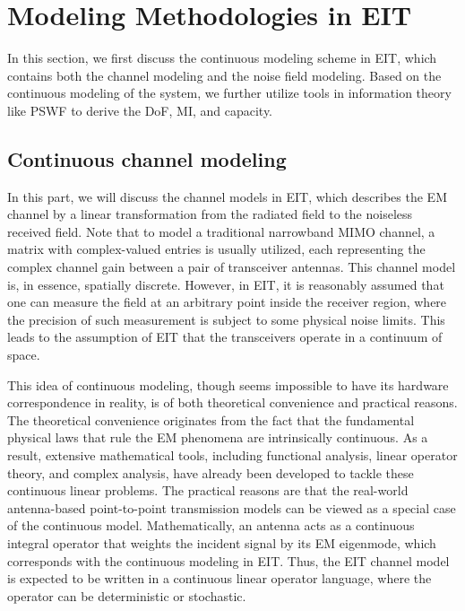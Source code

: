 \documentclass[journal,twocolumn]{IEEEtran}
\begin{document}
\section{Modeling Methodologies in EIT}
In this section, we first discuss the continuous modeling scheme in EIT, which contains both the channel modeling and the noise field modeling. 
Based on the continuous modeling of the system, we further utilize tools in information theory like PSWF to derive the DoF, MI, and capacity.

\subsection{Continuous channel modeling}
In this part, we will discuss the channel models in EIT, which describes the EM channel by a linear transformation from the radiated field to the noiseless received field.  
Note that to model a traditional narrowband MIMO channel, a matrix with complex-valued entries is usually utilized, each representing the complex channel gain between a pair of transceiver antennas. 
This channel model is, in essence, spatially discrete. 
However, in EIT, it is reasonably assumed that one can measure the field at an arbitrary point inside the receiver region, where the precision of such measurement is subject to some physical noise limits. This leads to the assumption of EIT that the transceivers operate in a continuum of space.  

This idea of continuous modeling, though seems impossible to have its hardware correspondence in reality, is of both theoretical convenience and practical reasons. 
The theoretical convenience originates from the fact that the fundamental physical laws that rule the EM phenomena are intrinsically continuous. 
As a result, extensive mathematical tools, including functional analysis, linear operator theory, and complex analysis, have already been developed to tackle these continuous linear problems. 
The practical reasons are that the real-world antenna-based point-to-point transmission models can be viewed as a special case of the continuous model. 
Mathematically, an antenna acts as a continuous integral operator that weights the incident signal by its EM eigenmode, which corresponds with the continuous modeling in EIT. 
Thus, the EIT channel model is expected to be written in a continuous linear operator language, where the operator can be deterministic or stochastic.
\end{document}
